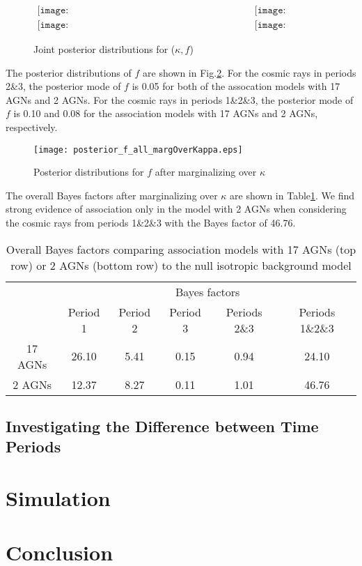 \documentclass[dvips,aoas]{imsart}
\begin{document}
\begin{figure}
\centerline{$
\begin{array}{cc}
\texttt{[image: posteriorJoint\_fkappa\_17AGNs\_periods23.eps]} &
\texttt{[image: posteriorJoint\_fkappa\_17AGNs\_periods123.eps]}\\
\texttt{[image: posteriorJoint\_fkappa\_2AGNs\_periods23.eps]} &
\texttt{[image: posteriorJoint\_fkappa\_2AGNs\_periods123.eps]}
\end{array}$}
\caption{Joint posterior distributions for ($\kappa,f$)}
\label{fig:jointkappaf}
\end{figure}

The posterior distributions of $f$ are shown in Fig.\ref{fig:postf2}. For the cosmic rays in periods 2\&3,
the posterior mode of $f$ is 0.05 for both of the assocation models with 17 AGNs and 2 AGNs. For the
cosmic rays in periods 1\&2\&3, the posterior mode of $f$ is 0.10 and 0.08 for the association models with
17 AGNs and 2 AGNs, respectively.
\begin{figure}
\centerline{\texttt{[image: posterior\_f\_all\_margOverKappa.eps]} }
\caption{Posterior distributions for $f$ after marginalizing over $\kappa$}
\label{fig:postf2}
\end{figure}

The overall Bayes factors after marginalizing over $\kappa$ are shown in Table\ref{tab:BFtab}. We find strong
evidence of association only in the model with 2 AGNs when considering the cosmic rays from periods 1\&2\&3
with the Bayes factor of 46.76.
\begin{table}
\begin{tabular}{|c|c |c| c| c| c|}
\hline
& \multicolumn{5}{|c|}{Bayes factors}\\
\cline{2-6}
 &Period 1 & Period 2 & Period 3 & Periods 2\&3 & Periods 1\&2\&3\\
\hline
17 AGNs & 26.10 & 5.41 & 0.15 & 0.94 & 24.10\\
2 AGNs  & 12.37 & 8.27 & 0.11 & 1.01 & 46.76\\
\hline
\end{tabular}
\caption{Overall Bayes factors comparing association models with 17 AGNs (top row) 
or 2 AGNs (bottom row) to the null isotropic background model}\label{tab:BFtab}
\end{table}


\subsection{Investigating the Difference between Time Periods}
\section{Simulation}
\section{Conclusion}




\end{document}
